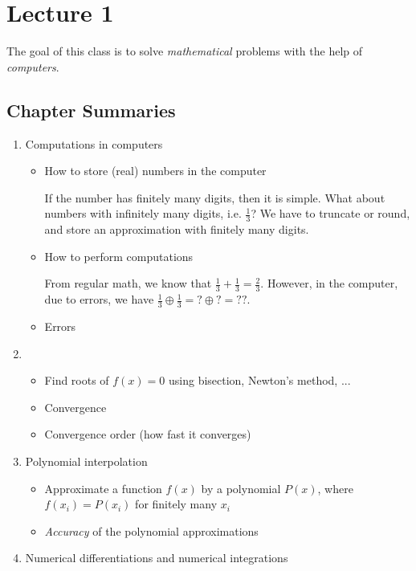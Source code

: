 \documentclass[class=article, crop=false]{standalone}
\begin{document}
  \section{Lecture 1}
  The goal of this class is to solve \emph{mathematical} problems with the help of \emph{computers}.
  \subsection{Chapter Summaries}
  \begin{enumerate}
    \item Computations in computers
    \begin{itemize}
      \item How to store (real) numbers in the computer
      \begin{note}{}
        If the number has finitely many digits, then it is simple. What about numbers with infinitely many digits, i.e. $\frac{1}{3}$? We have to truncate or round, and store an approximation with finitely many digits.
      \end{note}
      \item How to perform computations
      \begin{note}{}
        From regular math, we know that $\frac{1}{3} + \frac{1}{3} = \frac{2}{3}$. However, in the computer, due to errors, we have $\frac{1}{3}\oplus \frac{1}{3} = ? \oplus ? = ??$.
      \end{note}
      \item Errors
    \end{itemize}
    \item 
    \begin{itemize}
      \item Find roots of $f(x) = 0$ using bisection, Newton's method, ...
      \item Convergence
      \item Convergence order (how fast it converges)
    \end{itemize}
    \item Polynomial interpolation
    \begin{itemize}
      \item Approximate a function $f(x)$ by a polynomial $P(x)$, where $f(x_i) = P(x_i)$ for finitely many $x_i$
      \item \emph{Accuracy} of the polynomial approximations
    \end{itemize}
    \item Numerical differentiations and numerical integrations
    \begin{itemize}

\end{itemize}
\end{enumerate}
\end{document}
